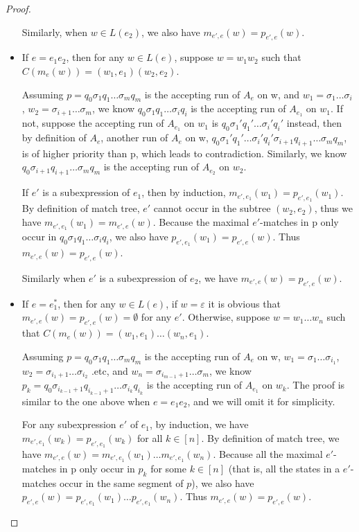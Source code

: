 \begin{proof}
\begin{itemize}
    Similarly, when $w \in L (e_2)$, we also have $m_{e', e} (w) = p_{e', e}
    (w)$.
    
    \item If $e = e_1 e_2$, then for any $w \in L (e)$, suppose $w = w_1 w_2$
    such that $C (m_e (w)) = (w_1, e_1) (w_2, e_2)$.
    
    Assuming $p = q_0 \sigma_1 q_1 \ldots \sigma_m q_m$ is the accepting run
    of $A_e$ on w, and $w_1 = \sigma_1 \ldots \sigma_i$, $w_2 = \sigma_{i + 1}
    \ldots \sigma_m$, we know $q_0 \sigma_1 q_1 \ldots \sigma_i q_i$ is the
    accepting run of $A_{e_1}$ on $w_1$. If not, suppose the accepting run of
    $A_{e_1}$ on $w_1$ is $q_0 \sigma_1' q_1' \ldots \sigma_i' q_i'$ instead,
    then by definition of $A_e$, another run of $A_e$ on
    w, $q_0 \sigma_1' q_1' \ldots \sigma_i' q_i'
    \sigma_{i + 1} q_{i + 1} \ldots \sigma_m q_m$, is of higher priority than p, which leads to contradiction.
    Similarly, we know $q_0 \sigma_{i + 1} q_{i + 1} \ldots \sigma_m q_m$ is
    the accepting run of $A_{e_2}$ on $w_2$.
    
    If $e'$ is a subexpression of $e_1$, then by induction, $m_{e', e_1} (w_1)
    = p_{e', e_1} (w_1)$. By definition of match tree, $e'$ cannot occur in
    the subtree $(w_2, e_2)$, thus we have $m_{e', e_1} (w_1) = m_{e', e}
    (w)$. Because the maximal $e'$-matches in p only occur in $q_0 \sigma_1
    q_1 \ldots \sigma_i q_i$, we also have $p_{e', e_1} (w_1) = p_{e', e}
    (w)$. Thus $m_{e', e} (w) = p_{e', e} (w)$.
    
    Similarly when $e'$ is a subexpression of $e_2$, we have $m_{e', e} (w) =
    p_{e', e} (w)$.
    
    \item If $e = e_1^{\ast}$, then for any $w \in L (e)$, if $w =
    \varepsilon$ it is obvious that $m_{e', e} (w) = p_{e', e} (w) =
    \emptyset$ for any $e'$. Otherwise, suppose $w = w_1 \ldots w_n$ such that
    $C (m_e (w)) = (w_1, e_1) \ldots (w_n, e_1)$.
    
    Assuming $p = q_0 \sigma_1 q_1 \ldots \sigma_m q_m$ is the accepting run
    of $A_e$ on w, $w_1 = \sigma_1 \ldots \sigma_{i_1}$, $w_2 = \sigma_{i_1 +
    1} \ldots \sigma_{i_2}$ .etc, and $w_n = \sigma_{i_{m - 1} + 1} \ldots
    \sigma_m$, we know $p_k = q_0 \sigma_{i_{k - 1} + 1} q_{i_{k - 1} + 1}
    \ldots \sigma_{i_k} q_{i_k}$ is the accepting run of $A_{e_1}$ on
    $w_k$. The proof is similar to the one above when $e = e_1 e_2$, and we
    will omit it for simplicity.
    
    For any subexpression $e'$ of $e_1$, by induction, we have $m_{e', e_1}
    (w_k) = p_{e', e_1} (w_k)$ for all $k \in [n]$. By definition of match
    tree, we have $m_{e', e} (w) = m_{e', e_1} (w_1) \ldots m_{e', e_1}
    (w_n)$. Because all the maximal $e'$-matches in p only occur in $p_k$ for
    some $k \in [n]$ (that is, all the states in a $e'$-matches occur in the
    same segment of $p$), we also have $p_{e', e} (w) = p_{e', e_1} (w_1)
    \ldots p_{e', e_1} (w_n)$. Thus $m_{e', e} (w) = p_{e', e} (w)$.
  \end{itemize}
\end{proof}
